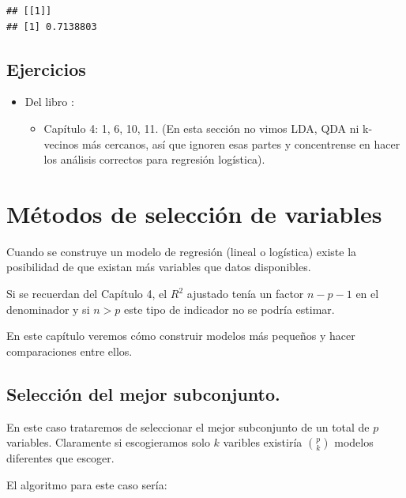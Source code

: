 \documentclass[
  12pt,
]{book}
\providecommand{\tightlist}{%
  \setlength{\itemsep}{0pt}\setlength{\parskip}{0pt}}
\theoremstyle{definition}
\theoremstyle{definition}
\theoremstyle{definition}
\theoremstyle{remark}
\begin{document}
\begin{verbatim}
## [[1]]
## [1] 0.7138803
\end{verbatim}

\hypertarget{ejercicios-4}{%
\section{Ejercicios}\label{ejercicios-4}}

\begin{itemize}
\tightlist
\item
  Del libro \autocite{James2013b}:

  \begin{itemize}
  \tightlist
  \item
    Capítulo 4: 1, 6, 10, 11. (En esta sección no vimos LDA, QDA ni k-vecinos más cercanos, así que ignoren esas partes y concentrense en hacer los análisis correctos para regresión logística).
  \end{itemize}
\end{itemize}

\hypertarget{muxe9todos-de-selecciuxf3n-de-variables}{%
\chapter{Métodos de selección de variables}\label{muxe9todos-de-selecciuxf3n-de-variables}}

Cuando se construye un modelo de regresión (lineal o logística) existe la posibilidad de que existan más variables que datos disponibles.

Si se recuerdan del Capítulo 4, el \(R^{2}\) ajustado tenía un factor \(n-p-1\) en el denominador y si \(n>p\) este tipo de indicador no se podría estimar.

En este capítulo veremos cómo construir modelos más pequeños y hacer comparaciones entre ellos.

\hypertarget{selecciuxf3n-del-mejor-subconjunto.}{%
\section{Selección del mejor subconjunto.}\label{selecciuxf3n-del-mejor-subconjunto.}}

En este caso trataremos de seleccionar el mejor subconjunto de un total de \(p\) variables. Claramente si escogieramos solo \(k\) varibles existiría \(\binom{p}{k}\) modelos diferentes que escoger.

El algoritmo para este caso sería:
\end{document}

